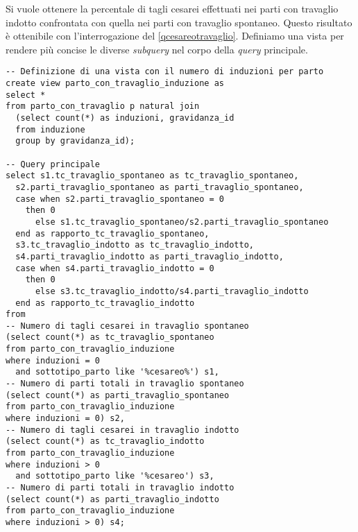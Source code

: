 Si vuole ottenere la percentale di tagli cesarei effettuati nei parti con travaglio indotto confrontata con quella nei parti con travaglio spontaneo.
Questo risultato è ottenibile con l'interrogazione del \lstlistingname{} \ref{qcesareotravaglio}.
Definiamo una vista  per rendere più concise le diverse \emph{subquery} nel corpo della \emph{query} principale.

\begin{lstlisting}[float,caption={Esempio di \emph{query}. Correlazione tra parto cesareo e travaglio indotto.},label=qcesareotravaglio]
-- Definizione di una vista con il numero di induzioni per parto
create view parto_con_travaglio_induzione as
select *
from parto_con_travaglio p natural join
  (select count(*) as induzioni, gravidanza_id
  from induzione
  group by gravidanza_id);

-- Query principale
select s1.tc_travaglio_spontaneo as tc_travaglio_spontaneo,
  s2.parti_travaglio_spontaneo as parti_travaglio_spontaneo,
  case when s2.parti_travaglio_spontaneo = 0
    then 0
	  else s1.tc_travaglio_spontaneo/s2.parti_travaglio_spontaneo
  end as rapporto_tc_travaglio_spontaneo,
  s3.tc_travaglio_indotto as tc_travaglio_indotto,
  s4.parti_travaglio_indotto as parti_travaglio_indotto,
  case when s4.parti_travaglio_indotto = 0
    then 0
	  else s3.tc_travaglio_indotto/s4.parti_travaglio_indotto
  end as rapporto_tc_travaglio_indotto
from
-- Numero di tagli cesarei in travaglio spontaneo
(select count(*) as tc_travaglio_spontaneo
from parto_con_travaglio_induzione
where induzioni = 0
  and sottotipo_parto like '%cesareo%') s1,
-- Numero di parti totali in travaglio spontaneo
(select count(*) as parti_travaglio_spontaneo
from parto_con_travaglio_induzione
where induzioni = 0) s2,
-- Numero di tagli cesarei in travaglio indotto
(select count(*) as tc_travaglio_indotto
from parto_con_travaglio_induzione
where induzioni > 0
  and sottotipo_parto like '%cesareo') s3,
-- Numero di parti totali in travaglio indotto
(select count(*) as parti_travaglio_indotto
from parto_con_travaglio_induzione
where induzioni > 0) s4;
\end{lstlisting}